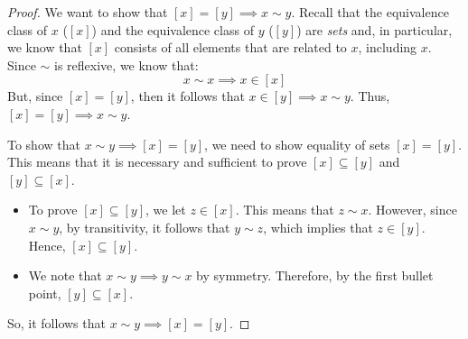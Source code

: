 \documentclass[letterpaper]{article}
\begin{document}
\begin{mdframed}
    \begin{proof}
        We want to show that $[x] = [y] \implies x \sim y$. Recall that the equivalence class of $x$ ($[x]$) and the equivalence class of $y$ ($[y]$) are \emph{sets} and, in particular, we know that $[x]$ consists of all elements that are related to $x$, including $x$. Since $\sim$ is reflexive, we know that:
        \[x \sim x \implies x \in [x]\]
        But, since $[x] = [y]$, then it follows that $x \in [y] \implies x \sim y$. Thus, $[x] = [y] \implies x \sim y$. 
        
        \bigskip 
    
        To show that $x \sim y \implies [x] = [y]$, we need to show equality of sets $[x] = [y]$. This means that it is necessary and sufficient to prove $[x] \subseteq [y]$ and $[y] \subseteq [x]$.
        \begin{itemize}
            \item To prove $[x] \subseteq [y]$, we let $z \in [x]$. This means that $z \sim x$. However, since $x \sim y$, by transitivity, it follows that $y \sim z$, which implies that $z \in [y]$. Hence, $[x] \subseteq [y]$. 
            \item We note that $x \sim y \implies y \sim x$ by symmetry. Therefore, by the first bullet point, $[y] \subseteq [x]$.
        \end{itemize} 
        So, it follows that $x \sim y \implies [x] = [y]$. 
    \end{proof}
\end{mdframed}
\end{document}
